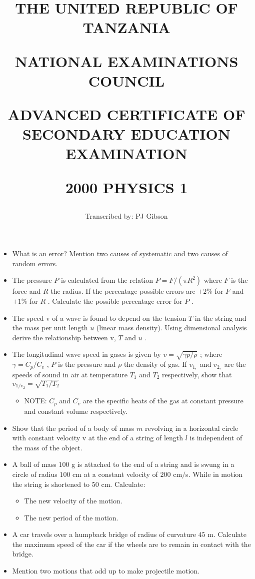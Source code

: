 \documentclass{article}
\title{THE UNITED REPUBLIC OF TANZANIA

NATIONAL EXAMINATIONS COUNCIL

ADVANCED CERTIFICATE OF SECONDARY EDUCATION EXAMINATION

\textbf{2000 PHYSICS 1}}
\author{Transcribed by:  PJ Gibson}
\begin{document}
\maketitle

\begin{itemize}
\item What is an error? Mention two causes of systematic and two causes of random errors.
\item The pressure $ P$ is calculated from the relation $ P=F/( \pi R^{2})$ where $ F$ is the force and $ R$ the radius. If the percentage possible errors are $ +2\%$ for $ F$ and $ +1\%$ for $ R$ . Calculate the possible percentage error for $ P$ .
\item The speed v of a wave is found to depend on the tension $ T$ in the string and the mass per unit length $ u$ (linear mass density). Using dimensional analysis derive the relationship between v, $ T$ and $ u$ .
\item The longitudinal wave speed in gases is given by $ v=\sqrt{\gamma p/ \rho }$ ; where $ \gamma =C_{p}/C_{v}$ , $ P$ is the pressure and $ \rho $ the density of gas. If $ v_{1,}$ and $ v_{2,}$ are the speeds of sound in air at temperature $ T_{1}$ and $ T_{2}$ respectively, show that $ v_{1/v_2}=\sqrt{T_{1}/T_{2}}$
 \begin{itemize}
\item NOTE: $ C_{p}$ and $ C_{v}$ are the specific heats of the gas at constant pressure and constant volume respectively.
\end{itemize}
\item Show that the period of a body of mass $ m$ revolving in a horizontal circle with constant velocity v at the end of a string of length $ l$ is independent of the mass of the object.
\item A ball of mass $ 100$ g is attached to the end of a string and is swung in a circle of radius $ 100$ cm at a constant velocity of $ 200$ cm$/$s. While in motion the string is shortened to $ 50$ cm. Calculate:
 \begin{itemize}
\item The new velocity of the motion.
\item The new period of the motion.
\end{itemize}
\item A car travels over a humpback bridge of radius of curvature $ 45$ m. Calculate the maximum speed of the car if the wheels are to remain in contact with the bridge.
\item Mention two motions that add up to make projectile motion.

\end{itemize}
\end{document}
